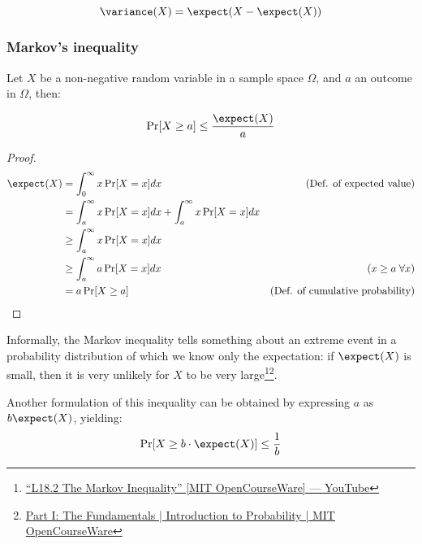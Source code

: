 \[
    \variance(X) = \expect(X - \expect(X))
\]

\subsubsection{Markov's inequality}

\begin{theorem}
    Let $X$ be a non-negative random variable in a sample space $\Omega$, and $a$ an outcome in $\Omega$, then:

    \begin{equation}\label{eq:markov}
        \Pr[X \geq a] \leq \frac{\expect(X)}{a}
    \end{equation}
\end{theorem}

\begin{proof}
    \begin{align*}
        \expect(X) &= \int_{0}^{\infty} x \Pr[X = x]dx    & \text{(Def. of expected value)}         & \\
                   &= \int_{a}^{\infty} x \Pr[X = x]dx + \int_{a}^{\infty} x \Pr[X = x]dx &         & \\
                   &\geq \int_{a}^{\infty} x \Pr[X = x]dx &                                         & \\
                   &\geq \int_{a}^{\infty} a \Pr[X = x]dx & \text{($x \geq a \;\forall x$)}         & \\
                   &= a \Pr[X \geq a]                     & \text{(Def. of cumulative probability)} & \qedhere
    \end{align*}
\end{proof}

Informally, the Markov inequality tells something about an extreme event in a probability distribution of which we know only the expectation: if $\expect(X)$ is small, then it is very unlikely for $X$ to be very large\footnote{\linkicon \href{https://youtu.be/vjYanZ1nsZg}{\textsf{``L18.2 The Markov Inequality'' [MIT OpenCourseWare] --- YouTube}}}\footnote{\linkicon \href{https://ocw.mit.edu/resources/res-6-012-introduction-to-probability-spring-2018/part-i-the-fundamentals/}{\textsf{Part I: The Fundamentals | Introduction to Probability | MIT OpenCourseWare}}}.

Another formulation of this inequality can be obtained by expressing $a$ as $b \expect(X)$, yielding:
\begin{equation}\label{eq:markov2}
    \Pr[X \geq b \cdot \expect(X)] \leq \frac{1}{b}
\end{equation}


